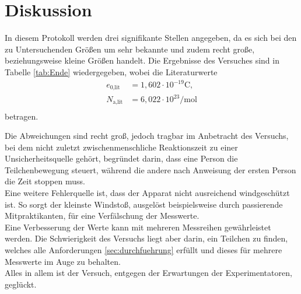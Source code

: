 \section{Diskussion}
\label{sec:Diskussion}

In diesem Protokoll werden drei signifikante Stellen angegeben, da es sich bei den zu Untersuchenden Größen um sehr bekannte und zudem recht große, beziehungsweise kleine Größen handelt.
Die Ergebnisse des Versuches sind in Tabelle \ref{tab:Ende} wiedergegeben, wobei die Literaturwerte \cite{chemie}
\begin{align*}
  e_{0\text{,lit}} &= 1,602 \cdot 10^{-19}\si{\coulomb},\\
  N_{\text{a,lit}} &= 6,022 \cdot 10^{23}\si{\per\mol}\\
\end{align*}
betragen.

Die Abweichungen sind recht groß, jedoch tragbar im Anbetracht des Versuchs, bei dem nicht zuletzt zwischenmenschliche Reaktionszeit zu einer Unsicherheitsquelle gehört, begründet darin, dass eine Person die Teilchenbewegung steuert, während die andere nach Anweisung der ersten Person die Zeit stoppen muss.\\
Eine weitere Fehlerquelle ist, dass der Apparat nicht ausreichend windgeschützt ist.
So sorgt der kleinste Windstoß, ausgelöst beispielsweise durch passierende Mitpraktikanten, für eine Verfälschung der Messwerte.\\
Eine Verbesserung der Werte kann mit mehreren Messreihen gewährleistet werden.
Die Schwierigkeit des Versuchs liegt aber darin, ein Teilchen zu finden, welches alle Anforderungen \ref{sec:durchfuehrung} erfüllt und dieses für mehrere Messwerte im Auge zu behalten.\\
Alles in allem ist der Versuch, entgegen der Erwartungen der Experimentatoren, geglückt.

